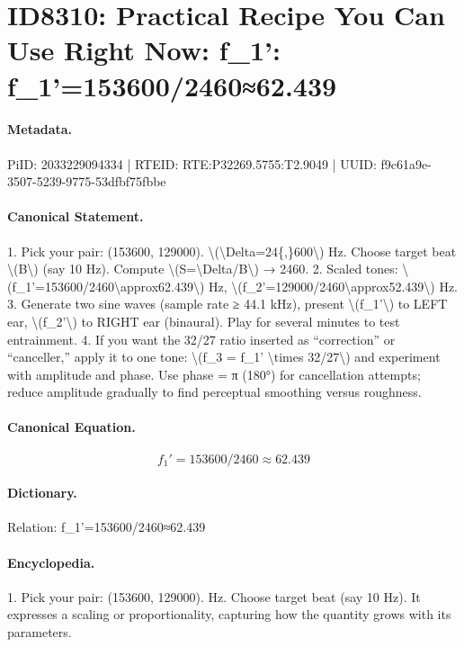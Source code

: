 \section*{ID8310: Practical Recipe You Can Use Right Now: f\_1': f\_1'=153600/2460≈62.439}
\paragraph{Metadata.}
PiID: 2033229094334 | RTEID: RTE:P32269.5755:T2.9049 | UUID: f9c61a9e-3507-5239-9775-53dfbf75fbbe

\paragraph{Canonical Statement.}
1. Pick your pair: (153600, 129000). \textbackslash{}(\textbackslash{}Delta=24\{,\}600\textbackslash{}) Hz. Choose target beat \textbackslash{}(B\textbackslash{}) (say 10 Hz). Compute \textbackslash{}(S=\textbackslash{}Delta/B\textbackslash{}) → 2460. 2. Scaled tones: \textbackslash{}(f\_1'=153600/2460\textbackslash{}approx62.439\textbackslash{}) Hz, \textbackslash{}(f\_2'=129000/2460\textbackslash{}approx52.439\textbackslash{}) Hz. 3. Generate two sine waves (sample rate ≥ 44.1 kHz), present \textbackslash{}(f\_1'\textbackslash{}) to LEFT ear, \textbackslash{}(f\_2'\textbackslash{}) to RIGHT ear (binaural). Play for several minutes to test entrainment. 4. If you want the 32/27 ratio inserted as “correction” or “canceller,” apply it to one tone: \textbackslash{}(f\_3 = f\_1' \textbackslash{}times 32/27\textbackslash{}) and experiment with amplitude and phase. Use phase = π (180°) for cancellation attempts; reduce amplitude gradually to find perceptual smoothing versus roughness.

\paragraph{Canonical Equation.}
\[
f_1'=153600/2460\approx62.439
\]

\paragraph{Dictionary.}
Relation: f\_1'=153600/2460≈62.439

\paragraph{Encyclopedia.}
1. Pick your pair: (153600, 129000). Hz. Choose target beat (say 10 Hz). It expresses a scaling or proportionality, capturing how the quantity grows with its parameters.
